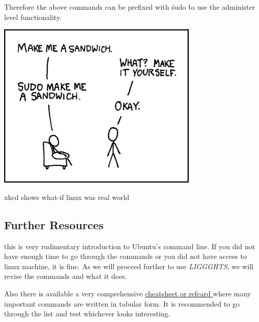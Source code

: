 \documentclass{tufte-book} %
\newcommand{\Li}{\textit{LIGGGHTS}\xspace}
\begin{document}
Therefore the above commands can be prefixed with \' sudo \'  to use the administer level functionality.

\begin{marginfigure}
\includegraphics[width=\linewidth]{sandwich.png}
\caption{xkcd shows what-if linux was real world}
\label{fig:sandwich}
\end{marginfigure}
\subsection{Further Resources}
 this is very rudimentary introduction to Ubuntu's command line. If you did not have enough time to go through the commands or you did not have access to linux machine, it is fine. As we will proceed further to use \Li, we will revise the commands and what it does.

Also there is available a very comprehensive \href{http://cli.learncodethehardway.org/bash_cheat_sheet.pdf}{cheatsheet or refcard } where many important commands are written in tabular form. It is recommended to go through the list and test whichever looks interesting. 
\end{document}
